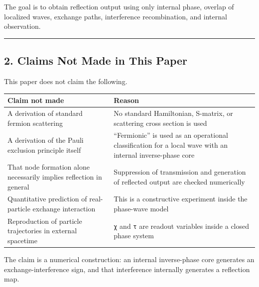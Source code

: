 \documentclass[
  a4paper,
]{article}
\newcounter{none} %
\begin{document}
The goal is to obtain reflection output using only internal phase,
overlap of localized waves, exchange paths, interference recombination,
and internal observation.

\begin{center}\rule{0.5\linewidth}{0.5pt}\end{center}

\subsection{2. Claims Not Made in This
Paper}\label{claims-not-made-in-this-paper}

This paper does not claim the following.

{\def\LTcaptype{none} %
\begin{longtable}[]{@{}
  >{\raggedright\arraybackslash}p{}
  >{\raggedright\arraybackslash}p{}@{}}
\toprule\noalign{}
\begin{minipage}[b]{\linewidth}\raggedright
Claim not made
\end{minipage} & \begin{minipage}[b]{\linewidth}\raggedright
Reason
\end{minipage} \\
\midrule\noalign{}
\endhead
\bottomrule\noalign{}
\endlastfoot
A derivation of standard fermion scattering & No standard Hamiltonian,
S-matrix, or scattering cross section is used \\
A derivation of the Pauli exclusion principle itself & ``Fermionic'' is
used as an operational classification for a local wave with an internal
inverse-phase core \\
That node formation alone necessarily implies reflection in general &
Suppression of transmission and generation of reflected output are
checked numerically \\
Quantitative prediction of real-particle exchange interaction & This is
a constructive experiment inside the phase-wave model \\
Reproduction of particle trajectories in external spacetime & \texttt{χ}
and \texttt{τ} are readout variables inside a closed phase system \\
\end{longtable}
}

The claim is a numerical construction: an internal inverse-phase core
generates an exchange-interference sign, and that interference
internally generates a reflection map.
\end{document}
